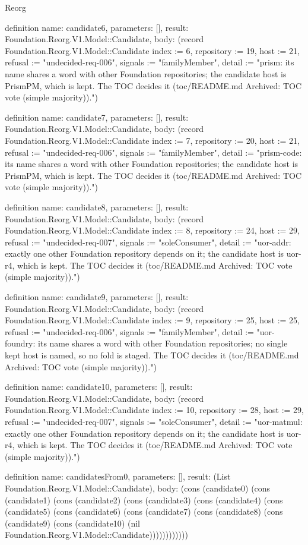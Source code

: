 \begin{lexlean}{Reorg}
\begin{semanticmodule}
definition{
  name: candidate6,
  parameters: [],
  result: Foundation.Reorg.V1.Model::Candidate,
  body: (record Foundation.Reorg.V1.Model::Candidate {index := 6, repository := 19, host := 21, refusal := "undecided-req-006", signals := "familyMember", detail := "prism: its name shares a word with other Foundation repositories; the candidate host is PrismPM, which is kept. The TOC decides it (toc/README.md Archived: TOC vote (simple majority))."})
}

definition{
  name: candidate7,
  parameters: [],
  result: Foundation.Reorg.V1.Model::Candidate,
  body: (record Foundation.Reorg.V1.Model::Candidate {index := 7, repository := 20, host := 21, refusal := "undecided-req-006", signals := "familyMember", detail := "prism-code: its name shares a word with other Foundation repositories; the candidate host is PrismPM, which is kept. The TOC decides it (toc/README.md Archived: TOC vote (simple majority))."})
}

definition{
  name: candidate8,
  parameters: [],
  result: Foundation.Reorg.V1.Model::Candidate,
  body: (record Foundation.Reorg.V1.Model::Candidate {index := 8, repository := 24, host := 29, refusal := "undecided-req-007", signals := "soleConsumer", detail := "uor-addr: exactly one other Foundation repository depends on it; the candidate host is uor-r4, which is kept. The TOC decides it (toc/README.md Archived: TOC vote (simple majority))."})
}

definition{
  name: candidate9,
  parameters: [],
  result: Foundation.Reorg.V1.Model::Candidate,
  body: (record Foundation.Reorg.V1.Model::Candidate {index := 9, repository := 25, host := 25, refusal := "undecided-req-006", signals := "familyMember", detail := "uor-foundry: its name shares a word with other Foundation repositories; no single kept host is named, so no fold is staged. The TOC decides it (toc/README.md Archived: TOC vote (simple majority))."})
}

definition{
  name: candidate10,
  parameters: [],
  result: Foundation.Reorg.V1.Model::Candidate,
  body: (record Foundation.Reorg.V1.Model::Candidate {index := 10, repository := 28, host := 29, refusal := "undecided-req-007", signals := "soleConsumer", detail := "uor-matmul: exactly one other Foundation repository depends on it; the candidate host is uor-r4, which is kept. The TOC decides it (toc/README.md Archived: TOC vote (simple majority))."})
}

definition{
  name: candidatesFrom0,
  parameters: [],
  result: (List Foundation.Reorg.V1.Model::Candidate),
  body: (cons (candidate0) (cons (candidate1) (cons (candidate2) (cons (candidate3) (cons (candidate4) (cons (candidate5) (cons (candidate6) (cons (candidate7) (cons (candidate8) (cons (candidate9) (cons (candidate10) (nil Foundation.Reorg.V1.Model::Candidate))))))))))))
}


\end{semanticmodule}
\end{lexlean}
